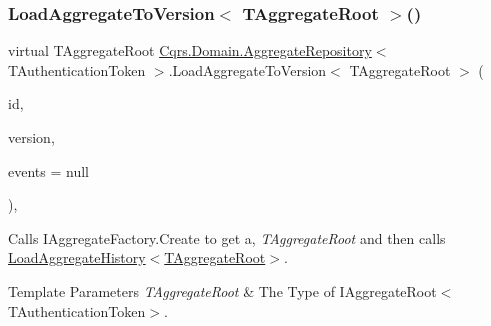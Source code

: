 \subsubsection{\texorpdfstring{Load\+Aggregate\+To\+Version$<$ T\+Aggregate\+Root $>$()}{LoadAggregateToVersion< TAggregateRoot >()}}
{\footnotesize\ttfamily virtual T\+Aggregate\+Root \hyperlink{classCqrs_1_1Domain_1_1AggregateRepository}{Cqrs.\+Domain.\+Aggregate\+Repository}$<$ T\+Authentication\+Token $>$.Load\+Aggregate\+To\+Version$<$ T\+Aggregate\+Root $>$ (\begin{DoxyParamCaption}\item[{Guid}]{id,  }\item[{int}]{version,  }\item[{I\+List$<$ \hyperlink{interfaceCqrs_1_1Events_1_1IEvent}{I\+Event}$<$ T\+Authentication\+Token $>$$>$}]{events = {\ttfamily null} }\end{DoxyParamCaption})\hspace{0.3cm}{\ttfamily [protected]}, {\ttfamily [virtual]}}



Calls I\+Aggregate\+Factory.\+Create to get a, {\itshape T\+Aggregate\+Root}  and then calls \hyperlink{classCqrs_1_1Domain_1_1AggregateRepository_af26efcb464ac989962a9ad138466e4d7_af26efcb464ac989962a9ad138466e4d7}{Load\+Aggregate\+History$<$\+T\+Aggregate\+Root$>$}. 


\begin{DoxyTemplParams}{Template Parameters}
{\em T\+Aggregate\+Root} & The Type of I\+Aggregate\+Root$<$\+T\+Authentication\+Token$>$.\\
\hline
\end{DoxyTemplParams}

